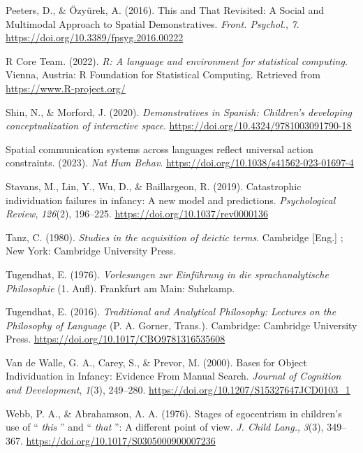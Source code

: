 \documentclass[
  man,floatsintext]{apa6}
\newlength{\cslhangindent}
\newenvironment{CSLReferences}[2] %
 {\begin{list}{}{%
  \setlength{\itemindent}{0pt}
  \setlength{\leftmargin}{0pt}
  \setlength{\parsep}{0pt}
  \ifodd #1
   \setlength{\leftmargin}{\cslhangindent}
   \setlength{\itemindent}{-1\cslhangindent}
  \fi
  \setlength{\itemsep}{#2\baselineskip}}}
 {\end{list}}
\begin{document}
\begin{CSLReferences}{1}{0}
Peeters, D., \& Özyürek, A. (2016). This and {That} {Revisited}: {A} {Social} and {Multimodal} {Approach} to {Spatial} {Demonstratives}. \emph{Front. Psychol.}, \emph{7}. \url{https://doi.org/10.3389/fpsyg.2016.00222}

R Core Team. (2022). \emph{R: A language and environment for statistical computing}. Vienna, Austria: R Foundation for Statistical Computing. Retrieved from \url{https://www.R-project.org/}

Shin, N., \& Morford, J. (2020). \emph{Demonstratives in {Spanish}: {Children}'s developing conceptualization of interactive space}. \url{https://doi.org/10.4324/9781003091790-18}

Spatial communication systems across languages reflect universal action constraints. (2023). \emph{Nat Hum Behav}. \url{https://doi.org/10.1038/s41562-023-01697-4}

Stavans, M., Lin, Y., Wu, D., \& Baillargeon, R. (2019). Catastrophic individuation failures in infancy: {A} new model and predictions. \emph{Psychological Review}, \emph{126}(2), 196--225. \url{https://doi.org/10.1037/rev0000136}

Tanz, C. (1980). \emph{Studies in the acquisition of deictic terms}. Cambridge {[}Eng.{]} ; New York: Cambridge University Press.

Tugendhat, E. (1976). \emph{Vorlesungen zur {Einf{ü}hrung} in die sprachanalytische {Philosophie}} (1. Aufl). Frankfurt am Main: Suhrkamp.

Tugendhat, E. (2016). \emph{Traditional and {Analytical} {Philosophy}: {Lectures} on the {Philosophy} of {Language}} (P. A. Gorner, Trans.). Cambridge: Cambridge University Press. \url{https://doi.org/10.1017/CBO9781316535608}

Van de Walle, G. A., Carey, S., \& Prevor, M. (2000). Bases for {Object} {Individuation} in {Infancy}: {Evidence} {From} {Manual} {Search}. \emph{Journal of Cognition and Development}, \emph{1}(3), 249--280. \url{https://doi.org/10.1207/S15327647JCD0103_1}

Webb, P. A., \& Abrahamson, A. A. (1976). Stages of egocentrism in children's use of {`` \emph{this} ''} and {`` \emph{that} ''}: A different point of view. \emph{J. Child Lang.}, \emph{3}(3), 349--367. \url{https://doi.org/10.1017/S0305000900007236}


\end{CSLReferences}
\end{document}
